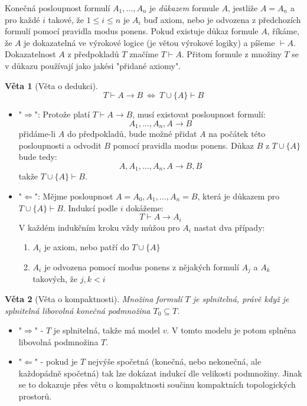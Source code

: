 \documentclass[a4paper]{article}      %
\newtheorem{theorem}{Věta}[section]
\newenvironment{proof}[1][Důkaz]{\begin{trivlist}
\item[\hskip \labelsep {\bfseries #1}]}{\end{trivlist}}
\newenvironment{definition}[1][Definice]{\begin{trivlist}
\item[\hskip \labelsep {\bfseries #1}]}{\end{trivlist}}
\begin{document}
\begin{definition}[Dokazatelnost]
Konečná posloupnost formulí $A_{1},\ldots,A_{n}$ je \emph{důkazem} formule $A$, jestliže $A=A_{n}$ a pro každé $i$ takové, že $1 \leq i \leq n$
je $A_{i}$ buď axiom, nebo je odvozena z předchozích formulí pomocí pravidla modus ponens. Pokud existuje důkaz formule $A$, říkáme, že $A$ je dokazatelná ve výrokové logice (je větou výrokové logiky) a píšeme $\vdash A$.
Dokazatelnost $A$ z předpokladů $T$ značíme $T \vdash A$. Přitom formule z množiny $T$ se v důkazu používají jako jakési "přidané axiomy".  
\end{definition}

\begin{theorem}[Věta o dedukci]
\[
T \vdash A \rightarrow B\ \Leftrightarrow\ T \cup \lbrace A \rbrace \vdash B
\]
\end{theorem}

\begin{proof}
\begin{itemize}
\item "$\Rightarrow$": Protože platí $T \vdash A \rightarrow B$, musí existovat posloupnost formulí:
\[
A_{1},\ldots,A_{n},A \rightarrow B
\]
přidáme-li $A$ do předpokladů, bude možné přidat $A$ na počátek této posloupnosti a odvodit $B$ pomocí pravidla modus ponens.
Důkaz $B$ z $T \cup \lbrace A \rbrace$ bude tedy:
\[
A,A_{1},\ldots,A_{n},A \rightarrow B,B
\]
takže $T \cup \lbrace A \rbrace \vdash B$.
\item "$\Leftarrow$": Mějme posloupnost $A = A_{0},A_{1},\ldots,A_{n} = B$, která je důkazem pro $T \cup \lbrace A \rbrace \vdash B$.
Indukcí podle $i$ dokážeme:
\[
T \vdash A \rightarrow A_{i}
\]
V každém indukčním kroku vždy můžou pro $A_{i}$ nastat dva případy:
\begin{enumerate}
	\item $A_{i}$ je axiom, nebo patří do $T \cup \lbrace A \rbrace$
	\item $A_{i}$ je odvozena pomocí modus ponens z nějakých formulí $A_{j}$ a $A_{k}$ takových, že $j,k < i$
\end{enumerate}
\end{itemize}
\end{proof}

\begin{theorem}[Věta o kompaktnosti]
Množina formulí $T$ je splnitelná, právě když je splnitelná libovolná konečná podmnožina $T_{0} \subseteq T$.
\end{theorem}
\begin{proof}
\begin{itemize}
\item "$\Rightarrow$" - $T$ je splnitelná, takže má model $v$. V tomto modelu je potom splněna libovolná podmnožina $T$.
\item "$\Leftarrow$" - pokud je $T$ nejvýše spočetná (konečná, nebo nekonečná, ale každopádně spočetná) tak
lze dokázat indukcí dle velikosti podmnožiny. Jinak se to dokazuje přes větu o kompaktnosti součinu kompaktních topologických prostorů.
\end{itemize}
\end{proof}
\end{document}
